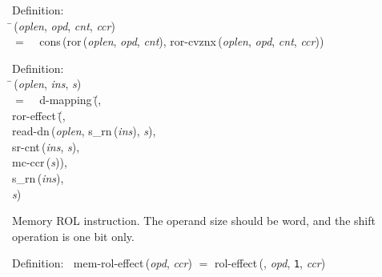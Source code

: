 \begin{tabbing}{\sc Definition}: \\  
\=\,({\it{oplen\/}}, {\it{opd\/}}, {\it{cnt\/}}, {\it{ccr\/}}) \\ 
$=$$\;\;\;\;${\rm{cons}}\,({\rm{ror}}\,({\it{oplen\/}}, {\it{opd\/}}, {\it{cnt\/}}), {\rm{ror-cvznx}}\,({\it{oplen\/}}, {\it{opd\/}}, {\it{cnt\/}}, {\it{ccr\/}}))\-
\end{tabbing}

\begin{tabbing}{\sc Definition}: \\  
\=\,({\it{oplen\/}}, {\it{ins\/}}, {\it{s\/}}) \\ 
$=$$\;\;\;\;${\rm{d-mapping}}\,(\=, \\ 
{\rm{ror-effect}}\,(\=, \\ 
{\rm{read-dn}}\,({\it{oplen\/}}, {\rm{s\_rn}}\,({\it{ins\/}}), {\it{s\/}}), \\ 
{\rm{sr-cnt}}\,({\it{ins\/}}, {\it{s\/}}), \\ 
{\rm{mc-ccr}}\,({\it{s\/}}))\-, \\ 
{\rm{s\_rn}}\,({\it{ins\/}}), \\ 
{\it{s\/}})\-\-
\end{tabbing}

 Memory ROL instruction.
 The operand size should be word, and the shift operation is one bit only.
\begin{tabbing}{\sc Definition}:$\;\;$
{\rm{mem-rol-effect}}\,({\it{opd\/}}, {\it{ccr\/}}) $=$ {\rm{rol-effect}}\,({}, {\it{opd\/}}, {\tt{1}}, {\it{ccr\/}})
\end{tabbing}

